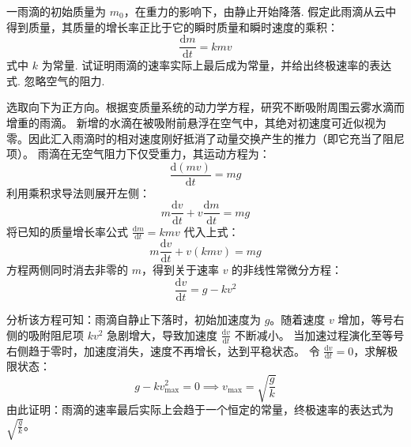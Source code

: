 \begin{exercise}\label{ex:5.5}
一雨滴的初始质量为 $m_0$，在重力的影响下，由静止开始降落. 假定此雨滴从云中得到质量，其质量的增长率正比于它的瞬时质量和瞬时速度的乘积：
$$ \frac{\mathrm{d}m}{\mathrm{d}t} = kmv $$
式中 $k$ 为常量. 试证明雨滴的速率实际上最后成为常量，并给出终极速率的表达式. 忽略空气的阻力.
\end{exercise}
\begin{solution}
选取向下为正方向。根据变质量系统的动力学方程，研究不断吸附周围云雾水滴而增重的雨滴。
新增的水滴在被吸附前悬浮在空气中，其绝对初速度可近似视为零。因此汇入雨滴时的相对速度刚好抵消了动量交换产生的推力（即它充当了阻尼项）。
雨滴在无空气阻力下仅受重力，其运动方程为：
$$ \frac{\mathrm{d}(mv)}{\mathrm{d}t} = mg $$
利用乘积求导法则展开左侧：
$$ m \frac{\mathrm{d}v}{\mathrm{d}t} + v \frac{\mathrm{d}m}{\mathrm{d}t} = mg $$
将已知的质量增长率公式 $\frac{\mathrm{d}m}{\mathrm{d}t} = kmv$ 代入上式：
$$ m \frac{\mathrm{d}v}{\mathrm{d}t} + v(kmv) = mg $$
方程两侧同时消去非零的 $m$，得到关于速率 $v$ 的非线性常微分方程：
$$ \frac{\mathrm{d}v}{\mathrm{d}t} = g - kv^2 $$

分析该方程可知：雨滴自静止下落时，初始加速度为 $g$。随着速度 $v$ 增加，等号右侧的吸附阻尼项 $kv^2$ 急剧增大，导致加速度 $\frac{\mathrm{d}v}{\mathrm{d}t}$ 不断减小。
当加速过程演化至等号右侧趋于零时，加速度消失，速度不再增长，达到平稳状态。
令 $\frac{\mathrm{d}v}{\mathrm{d}t} = 0$，求解极限状态：
$$ g - k v_{\text{max}}^2 = 0 \implies v_{\text{max}} = \sqrt{\frac{g}{k}} $$
由此证明：雨滴的速率最后实际上会趋于一个恒定的常量，终极速率的表达式为 $\sqrt{\frac{g}{k}}$。
\end{solution}


